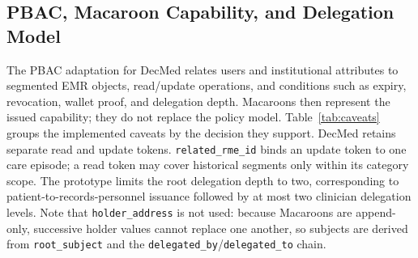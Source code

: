 \subsection{PBAC, Macaroon Capability, and Delegation Model}

The PBAC adaptation for DecMed relates users and institutional attributes to segmented EMR objects, read/update operations, and conditions such as expiry, revocation, wallet proof, and delegation depth. Macaroons then represent the issued capability; they do not replace the policy model. Table~\ref{tab:caveats} groups the implemented caveats by the decision they support. DecMed retains separate read and update tokens. \texttt{related\_rme\_id} binds an update token to one care episode; a read token may cover historical segments only within its category scope. The prototype limits the root delegation depth to two, corresponding to patient-to-records-personnel issuance followed by at most two clinician delegation levels. Note that \texttt{holder\_address} is not used: because Macaroons are append-only, successive holder values cannot replace one another, so subjects are derived from \texttt{root\_subject} and the \texttt{delegated\_by}/\texttt{delegated\_to} chain.

